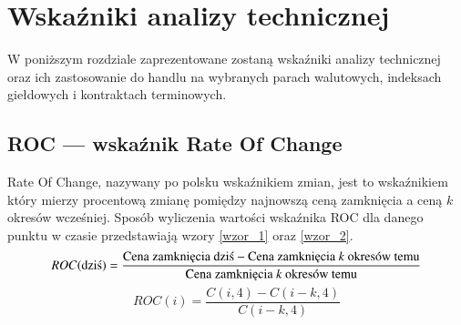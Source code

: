 

\chapter{Wskaźniki analizy technicznej}
\label{Indicators} %

W poniższym rozdziale zaprezentowane zostaną wskaźniki analizy technicznej oraz ich zastosowanie do handlu na wybranych parach walutowych, indeksach giełdowych i kontraktach terminowych.

\section{ROC --- wskaźnik Rate Of Change}
\label{sec:1ROC}
Rate Of Change, nazywany po polsku wskaźnikiem zmian, jest to wskaźnikiem który
mierzy procentową zmianę pomiędzy najnowszą ceną
zamknięcia a ceną $k$ okresów wcześniej. Sposób wyliczenia wartości wskaźnika ROC dla danego punktu w czasie przedstawiają wzory \ref{wzor_1} oraz \ref{wzor_2}.
\begin{equation}
ROC(\text{dziś}) = \frac{\text{Cena zamknięcia dziś} - \text{Cena zamknięcia } k \text{ okresów temu}}{\text{Cena zamknięcia } k \text{ okresów temu}}\\
\label{wzor_1}
\end{equation}
\begin{equation}
ROC(i) = \frac{C(i,4) - C(i-k,4)}{C(i-k,4)}
\label{wzor_2}
\end{equation}

